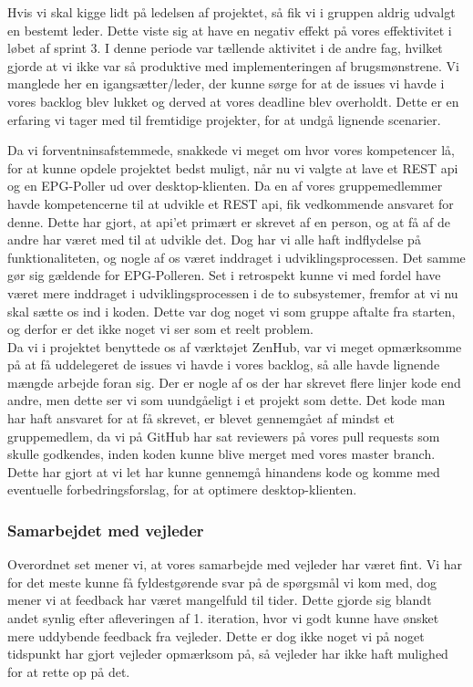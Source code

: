 Hvis vi skal kigge lidt på ledelsen af projektet, så fik vi i gruppen aldrig udvalgt en bestemt leder. Dette viste sig at have en negativ effekt på vores effektivitet i løbet af sprint 3. I denne periode var tællende aktivitet i de andre fag, hvilket gjorde at vi ikke var så produktive med implementeringen af brugsmønstrene. Vi manglede her en igangsætter/leder, der kunne sørge for at de issues vi havde i vores backlog blev lukket og derved at vores deadline blev overholdt. Dette er en erfaring vi tager med til fremtidige projekter, for at undgå lignende scenarier. 

Da vi forventninsafstemmede, snakkede vi meget om hvor vores kompetencer lå, for at kunne opdele projektet bedst muligt, når nu vi valgte at lave et REST api og en EPG-Poller ud over desktop-klienten. Da en af vores gruppemedlemmer havde kompetencerne til at udvikle et REST api, fik vedkommende ansvaret for denne. Dette har gjort, at api'et primært er skrevet af en person, og at få af de andre har været med til at udvikle det. Dog har vi alle haft indflydelse på funktionaliteten, og nogle af os været inddraget i udviklingsprocessen. Det samme gør sig gældende for EPG-Polleren. Set i retrospekt kunne vi med fordel have været mere inddraget i udviklingsprocessen i de to subsystemer, fremfor at vi nu skal sætte os ind i koden. Dette var dog noget vi som gruppe aftalte fra starten, og derfor er det ikke noget vi ser som et reelt problem.\\

Da vi i projektet benyttede os af værktøjet ZenHub, var vi meget opmærksomme på at få uddelegeret de issues vi havde i vores backlog, så alle havde lignende mængde arbejde foran sig. Der er nogle af os der har skrevet flere linjer kode end andre, men dette ser vi som uundgåeligt i et projekt som dette. Det kode man har haft ansvaret for at få skrevet, er blevet gennemgået af mindst et gruppemedlem, da vi på GitHub har sat reviewers på vores pull requests som skulle godkendes, inden koden kunne blive merget med vores master branch. Dette har gjort at vi let har kunne gennemgå hinandens kode og komme med eventuelle forbedringsforslag, for at optimere desktop-klienten.

\subsubsection{Samarbejdet med vejleder}
Overordnet set mener vi, at vores samarbejde med vejleder har været fint. Vi har for det meste kunne få fyldestgørende svar på de spørgsmål vi kom med, dog mener vi at feedback har været mangelfuld til tider. Dette gjorde sig blandt andet synlig efter afleveringen af 1. iteration, hvor vi godt kunne have ønsket mere uddybende feedback fra vejleder. Dette er dog ikke noget vi på noget tidspunkt har gjort vejleder opmærksom på, så vejleder har ikke haft mulighed for at rette op på det. \\
 
